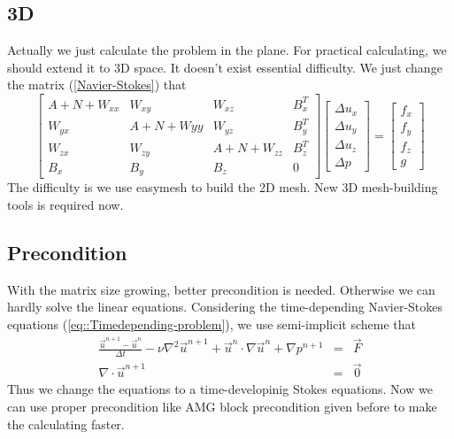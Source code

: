 \documentclass[a4paper]{article}
\begin{document}
\subsection{3D}
Actually we just calculate the problem in the plane. For practical calculating, we should extend it to 3D space. It doesn't exist essential difficulty. We just change the matrix (\ref{Navier-Stokes}) that
\begin{equation}
\left[ \begin{array}{cccc}
A + N +W_{xx} & W_{xy} & W_{xz} & B_x^T \\
W_{yx} & A +N +W{yy}& W_{yz} & B_y^T \\
W_{zx} & W_{zy}  &A + N + W_{zz} & B_z^T \\
B_x & B_y &B_z& 0
\end{array}
\right]
\left[\begin{array}{cccc}
\Delta u_x\\
\Delta u_y\\
\Delta u_z\\
\Delta p
\end{array}
\right]=
\left[\begin{array}{cccc}
f_x\\
f_y\\
f_z\\
g
\end{array}
\right]
\label{3D-Navier-Stokes}
\end{equation}
The difficulty is we use easymesh to build the 2D mesh. New 3D mesh-building tools is required now.
\subsection{Precondition}
With the matrix size growing, better precondition is needed. Otherwise we can hardly solve the linear equations. Considering the time-depending Navier-Stokes equations (\ref{eq::Timedepending-problem}), we use semi-implicit scheme that
\begin{equation}
\begin{array}{rcl}
\frac{\vec{u}^{n+1}-\vec{u}^n}{\Delta t} - \nu \nabla^2 \vec{u}^{n+1} + \vec{u}^{n}\cdot \nabla \vec{u}^n + \nabla p^{n+1} &=& \vec{F} \\
\nabla \cdot \vec{u}^{n+1} &=& \vec{0}
\label{eq::implicit and explicit}
\end{array}
\end{equation}
Thus we change the equations to a time-developinig Stokes equations. Now we can use proper precondition like AMG block precondition given before to make the calculating faster.



\end{document}
